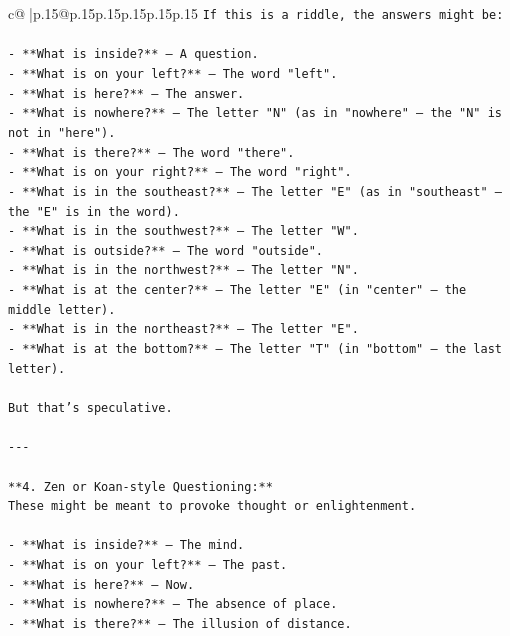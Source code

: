 \documentclass{article}
\begin{document}
{\begin{supertabular}{c@{$\;$}|p{.15\linewidth}@{}p{.15\linewidth}p{.15\linewidth}p{.15\linewidth}p{.15\linewidth}p{.15\linewidth}}
{{{\texttt{If this is a riddle, the answers might be:} \\
\\ 
\texttt{{-} **What is inside?** — A question.  } \\
\texttt{{-} **What is on your left?** — The word "left".  } \\
\texttt{{-} **What is here?** — The answer.  } \\
\texttt{{-} **What is nowhere?** — The letter "N" (as in "nowhere" — the "N" is not in "here").  } \\
\texttt{{-} **What is there?** — The word "there".  } \\
\texttt{{-} **What is on your right?** — The word "right".  } \\
\texttt{{-} **What is in the southeast?** — The letter "E" (as in "southeast" — the "E" is in the word).  } \\
\texttt{{-} **What is in the southwest?** — The letter "W".  } \\
\texttt{{-} **What is outside?** — The word "outside".  } \\
\texttt{{-} **What is in the northwest?** — The letter "N".  } \\
\texttt{{-} **What is at the center?** — The letter "E" (in "center" — the middle letter).  } \\
\texttt{{-} **What is in the northeast?** — The letter "E".  } \\
\texttt{{-} **What is at the bottom?** — The letter "T" (in "bottom" — the last letter).} \\
\\ 
\texttt{But that’s speculative.} \\
\\ 
\texttt{{-}{-}{-}} \\
\\ 
\texttt{**4. Zen or Koan{-}style Questioning:**  } \\
\texttt{These might be meant to provoke thought or enlightenment.} \\
\\ 
\texttt{{-} **What is inside?** — The mind.  } \\
\texttt{{-} **What is on your left?** — The past.  } \\
\texttt{{-} **What is here?** — Now.  } \\
\texttt{{-} **What is nowhere?** — The absence of place.  } \\
\texttt{{-} **What is there?** — The illusion of distance.  } \\
}}}
\end{supertabular}}
\end{document}
